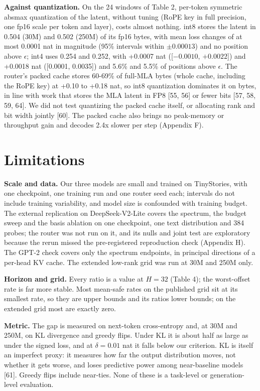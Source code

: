 \documentclass[11pt]{article}
\begin{document}
\textbf{Against quantization.} On the 24 windows of Table 2, per-token symmetric absmax quantization of the latent, without tuning (RoPE key in full precision, one fp16 scale per token and layer), costs almost nothing. int8 stores the latent in 0.504 (30M) and 0.502 (250M) of its fp16 bytes, with mean loss changes of at most 0.0001 nat in magnitude (95\% intervals within $\pm0.00013$) and no position above $\epsilon$; int4 uses 0.254 and 0.252, with +0.0007 nat ([$-0.0010$, $+0.0022$]) and +0.0018 nat ([0.0001, 0.0035]) and 5.6\% and 5.5\% of positions above $\epsilon$. The router's packed cache stores 60-69\% of full-MLA bytes (whole cache, including the RoPE key) at +0.10 to +0.18 nat, so int8 quantization dominates it on bytes, in line with work that stores the MLA latent in FP8 [55, 56] or fewer bits [57, 58, 59, 64]. We did not test quantizing the packed cache itself, or allocating rank and bit width jointly [60]. The packed cache also brings no peak-memory or throughput gain and decodes 2.4x slower per step (Appendix F).

\section{Limitations}

\textbf{Scale and data.} Our three models are small and trained on TinyStories, with one checkpoint, one training run and one router seed each; intervals do not include training variability, and model size is confounded with training budget. The external replication on DeepSeek-V2-Lite covers the spectrum, the budget sweep and the basis ablation on one checkpoint, one text distribution and 384 probes; the router was not run on it, and its nulls and joint test are exploratory because the rerun missed the pre-registered reproduction check (Appendix H). The GPT-2 check covers only the spectrum endpoints, in principal directions of a per-head KV cache. The extended low-rank grid was run at 30M and 250M only.

\textbf{Horizon and grid.} Every ratio is a value at $H=32$ (Table 4); the worst-offset rate is far more stable. Most mean-safe rates on the published grid sit at its smallest rate, so they are upper bounds and its ratios lower bounds; on the extended grid most are exactly zero.

\textbf{Metric.} The gap is measured on next-token cross-entropy and, at 30M and 250M, on KL divergence and greedy flips. Under KL it is about half as large as under the signed loss, and at $\delta=0.01$ nat it falls below our criterion. KL is itself an imperfect proxy: it measures how far the output distribution moves, not whether it gets worse, and loses predictive power among near-baseline models [61]. Greedy flips include near-ties. None of these is a task-level or generation-level evaluation.
\end{document}
